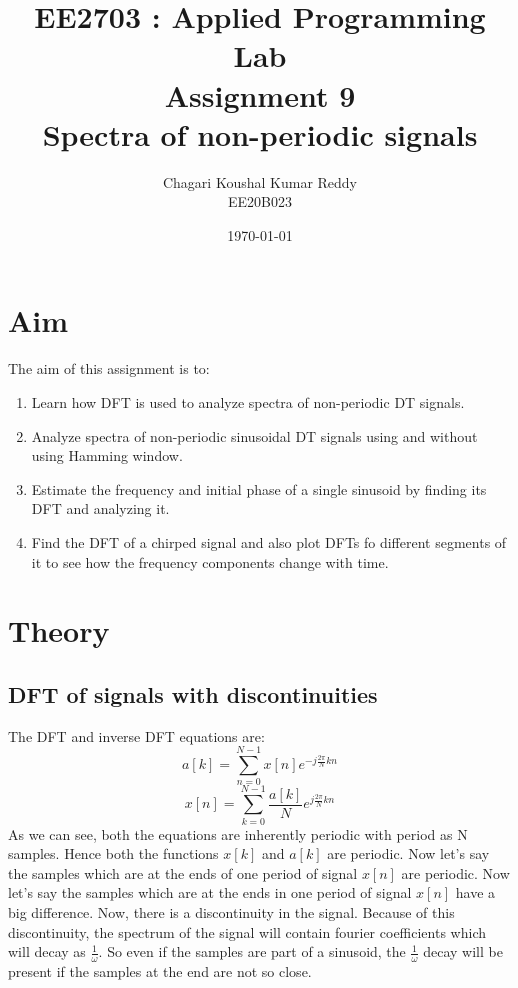 \documentclass[12pt, a4paper]{article}
\title{\textbf{EE2703 : Applied Programming Lab \\ Assignment 9 \\ Spectra of non-periodic signals}}
\author{Chagari Koushal Kumar Reddy \\ EE20B023} %
\date{\today} %
\begin{document}
		

\maketitle %
\clearpage

\tableofcontents
\clearpage

\section{Aim}
The aim of this assignment is to:
\begin{enumerate}
    \item Learn how DFT is used to analyze spectra of non-periodic DT signals.
    \item Analyze spectra of non-periodic sinusoidal DT signals using and without using Hamming window.
    \item Estimate the frequency and initial phase of a single sinusoid by finding its DFT and analyzing it.
    \item Find the DFT of a chirped signal and also plot DFTs fo different segments of it to see how the frequency components change with time.
\end{enumerate}
\section{Theory}
\subsection{DFT of signals with discontinuities}
The DFT and inverse DFT equations are:
\begin{equation*}
    a[k] = \sum_{n=0}^{N-1}x[n]e^{-j\frac{2\pi}{N}kn}
\end{equation*}
\begin{equation*}
    x[n] = \sum_{k=0}^{N-1}\frac{a[k]}{N}e^{j\frac{2\pi}{N}kn}
\end{equation*}
As we can see, both the equations are inherently periodic with period as N samples. Hence both the functions $x[k]$ and $a[k]$ are periodic. Now let's say the samples which are at the ends of one period of signal $x[n]$ are periodic. Now let's say the samples which are at the ends 
in one period of signal $x[n]$ have a big difference. Now, there is a discontinuity in the signal. Because of this discontinuity, the spectrum of the signal will contain fourier coefficients which will decay as $\frac{1}{\omega}$. So even if the samples are part of a sinusoid, the $\frac{1}{\omega}$ decay will be present if the samples at the end are not so close.
\end{document}
